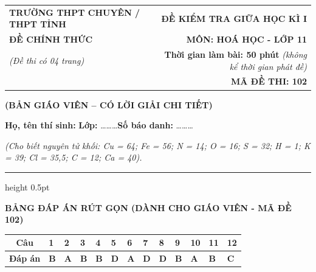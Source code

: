 \documentclass[11pt,a4paper]{article}
\begin{document}
\noindent
\begin{tabularx}{\textwidth}{@{}X r@{}}
\textbf{TRƯỜNG THPT CHUYÊN / THPT TỈNH} & \textbf{ĐỀ KIỂM TRA GIỮA HỌC KÌ I} \\
\textbf{ĐỀ CHÍNH THỨC} & \textbf{MÔN: HOÁ HỌC - LỚP 11} \\
\textit{(Đề thi có 04 trang)} & \textbf{Thời gian làm bài: 50 phút} \textit{(không kể thời gian phát đề)} \\
& \textbf{MÃ ĐỀ THI: 102}
\end{tabularx}

\begin{center}
{\color{hfRed}\textbf{\large (BẢN GIÁO VIÊN -- CÓ LỜI GIẢI CHI TIẾT)}}
\end{center}

\vspace{2pt}
\noindent\textbf{Họ, tên thí sinh:} \dotfill \textbf{Lớp:} \dots\dots\dots \textbf{Số báo danh:} \dots\dots\dots

\vspace{2pt}
\noindent\textit{(Cho biết nguyên tử khối: Cu = 64; Fe = 56; N = 14; O = 16; S = 32; H = 1; K = 39; Cl = 35,5; C = 12; Ca = 40).}
\vspace{2pt}
\hrule height 0.5pt
\vspace{6pt}

\begin{center}
{\color{hfRed}\textbf{\large BẢNG ĐÁP ÁN RÚT GỌN (DÀNH CHO GIÁO VIÊN - MÃ ĐỀ 102)}}
\end{center}

\begin{center}
\renewcommand{\arraystretch}{1.2}
\begin{tabular}{|c|*{12}{>{\centering\arraybackslash}m{0.95cm}|}}
\hline
\rowcolor{tableGreen}
\textbf{Câu} & \textbf{1} & \textbf{2} & \textbf{3} & \textbf{4} & \textbf{5} & \textbf{6} & \textbf{7} & \textbf{8} & \textbf{9} & \textbf{10} & \textbf{11} & \textbf{12} \\
\hline
\textbf{Đáp án} & \textbf{\color{hfRed}B} & \textbf{\color{hfRed}A} & \textbf{\color{hfRed}B} & \textbf{\color{hfRed}B} & \textbf{\color{hfRed}D} & \textbf{\color{hfRed}A} & \textbf{\color{hfRed}D} & \textbf{\color{hfRed}D} & \textbf{\color{hfRed}B} & \textbf{\color{hfRed}A} & \textbf{\color{hfRed}B} & \textbf{\color{hfRed}C} \\
\hline
\end{tabular}
\end{center}
\end{document}
